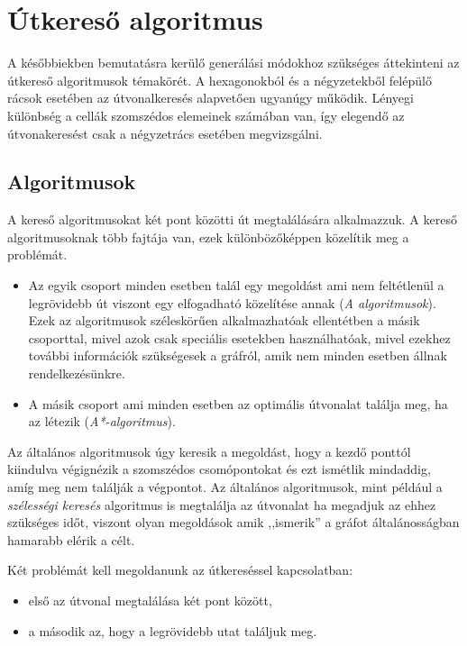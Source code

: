 \chapter{Útkereső algoritmus}

A későbbiekben bemutatásra kerülő generálási módokhoz szükséges áttekinteni az útkereső algoritmusok témakörét. A hexagonokból és a négyzetekből felépülő rácsok esetében az útvonalkeresés alapvetően ugyanúgy működik. Lényegi különbség a cellák szomszédos elemeinek számában van, így elegendő az útvonakeresést csak a négyzetrács esetében megvizsgálni.

\section{Algoritmusok}

A kereső algoritmusokat két pont közötti út megtalálására alkalmazzuk. 
A kereső algoritmusoknak több fajtája van, ezek különbözőképpen közelítik meg a problémát. 
\begin{itemize}
\item Az egyik csoport minden esetben talál egy megoldást ami nem feltétlenül a legrövidebb út viszont egy elfogadható közelítése annak (\textit{A algoritmusok}). Ezek az algoritmusok széleskörűen alkalmazhatóak ellentétben a másik csoporttal, mivel azok csak speciális esetekben használhatóak, mivel ezekhez további információk szükségesek a gráfról, amik nem minden esetben állnak rendelkezésünkre.
\item A másik csoport ami minden esetben az optimális útvonalat találja meg, ha az létezik (\textit{A*-algoritmus}).
\end{itemize}

Az általános algoritmusok úgy keresik a megoldást, hogy a kezdő ponttól kiindulva végignézik a szomszédos csomópontokat és ezt ismétlik mindaddig, amíg meg nem találják a végpontot. Az általános algoritmusok, mint például a \textit{szélességi keresés} algoritmus is megtalálja az útvonalat ha megadjuk az ehhez szükséges időt, viszont olyan megoldások amik ,,ismerik'' a gráfot általánosságban hamarabb elérik a célt.

Két problémát kell megoldanunk az útkereséssel kapcsolatban: 
\begin{itemize}
\item első az útvonal megtalálása két pont között, 
\item a második az, hogy a legrövidebb utat találjuk meg. 
\end{itemize}

